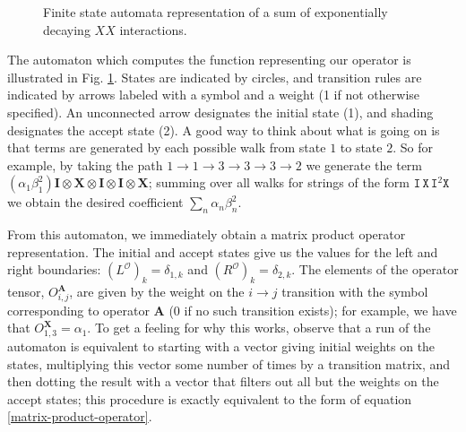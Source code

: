\documentclass[12pt]{amsbook}
\theoremstyle{plain}
\theoremstyle{definition}
\theoremstyle{remark}
\newcommand{\paren}[1]{\left(#1\right)}
\begin{document}
\begin{figure}
\begin{center}
\caption{Finite state automata representation of a sum of exponentially decaying $XX$ interactions.}
\label{finite-state-automaton}
\end{center}
\end{figure}

The automaton which computes the function representing our operator is illustrated in Fig. \ref{finite-state-automaton}.  States are indicated by circles, and transition rules are indicated by arrows labeled with a symbol and a weight  (1 if not otherwise specified).  An unconnected arrow designates the initial state (1), and shading designates the accept state (2).  A good way to think about what is going on is that terms are generated by each possible walk from state $1$ to state $2$.  So for example, by taking the path $1\!\to\!1\!\to\!3\!\to\!3\!\to\!3\!\to\!2$ we generate the term $(\alpha_1 \beta_1^2) \textbf{I} \otimes \textbf{X} \otimes \textbf{I}\otimes \textbf{I} \otimes \textbf{X}$;  summing over all walks for strings of the form $\texttt{I}\,\texttt{X}\,\texttt{I}^2\texttt{X}$ we obtain the desired coefficient $\sum_n \alpha_n \beta_n^2$.

From this automaton, we immediately obtain a matrix product operator representation.  The initial and accept states give us the values for the left and right boundaries:  $\paren{L^{\mathcal{O}}}_k=\delta_{1,k}$ and $\paren{R^{\mathcal{O}}}_k=\delta_{2,k}$.  The elements of the operator tensor, $O^{\textbf{A}}_{i,j}$, are given by the weight on the $i\to j$ transition with the symbol corresponding to operator $\textbf{A}$ (0 if no such transition exists);  for example, we have that $O^{\textbf{X}}_{1,3}=\alpha_1$.  To get a feeling for why this works, observe that a run of the automaton is equivalent to starting with a vector giving initial weights on the states, multiplying this vector some number of times by a transition matrix, and then dotting the result with a vector that filters out all but the weights on the accept states;  this procedure is exactly equivalent to the form of equation \eqref{matrix-product-operator}.
\end{document}
